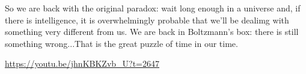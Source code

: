\documentclass[]{article}
\begin{document}
	So we are back with the original paradox: wait long enough in a universe and, if there is intelligence, it is overwhelmingly probable that we'll be dealimg with something very different from us. We are back in Boltzmann's box: there is still something wrong...That is the great puzzle of time in our time.
	
	
\url{https://youtu.be/jhnKBKZvb_U?t=2647}


\raggedright

\end{document}
